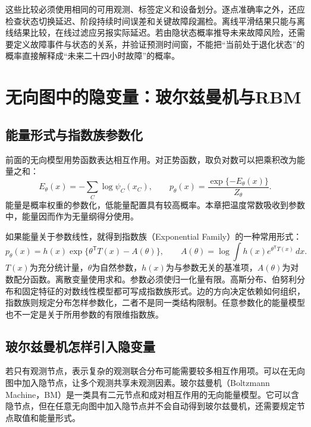 这些比较必须使用相同的可用观测、标签定义和设备划分。逐点准确率之外，还应检查状态切换延迟、阶段持续时间误差和关键故障段漏检。离线平滑结果只能与离线结果比较，在线过滤应另报实际延迟。若由隐状态概率推导未来故障风险，还需要定义故障事件与状态的关系，并验证预测时间窗，不能把“当前处于退化状态”的概率直接解释成“未来二十四小时故障”的概率。

\section{无向图中的隐变量：玻尔兹曼机与RBM}
\subsection{能量形式与指数族参数化}
前面的无向模型用势函数表达相互作用。对正势函数，取负对数可以把乘积改为能量之和：
\begin{equation}
 E_\theta(x)=-\sum_C\log\psi_C(x_C),\qquad
 p_\theta(x)=\frac{\exp\{-E_\theta(x)\}}{Z_\theta}.
 \label{eq:bayes-gibbs-energy}
\end{equation}
能量是概率权重的参数化，低能量配置具有较高概率。本章把温度常数吸收到参数中，能量因而作为无量纲得分使用。

如果能量关于参数线性，就得到指数族（Exponential Family）的一种常用形式：
\begin{equation}
 p_\theta(x)=h(x)\exp\{\theta^{\mathsf T}T(x)-A(\theta)\},
 \qquad A(\theta)=\log\int h(x)e^{\theta^{\mathsf T}T(x)}\,dx.
 \label{eq:bayes-exponential-family}
\end{equation}
$T(x)$为充分统计量，$\theta$为自然参数，$h(x)$为与参数无关的基准项，$A(\theta)$为对数配分函数。离散变量使用求和。参数必须使归一化量有限。高斯分布、伯努利分布和固定特征的对数线性模型都可写成指数族形式。边的方向决定依赖如何组织，指数族则规定分布怎样参数化，二者不是同一类结构限制。任意参数化的能量模型也不一定是关于所用参数的有限维指数族。

\subsection{玻尔兹曼机怎样引入隐变量}
若只有观测节点，表示复杂的观测联合分布可能需要较多相互作用项。可以在无向图中加入隐节点，让多个观测共享未观测因素。玻尔兹曼机（Boltzmann Machine，BM）是一类具有二元节点和成对相互作用的无向能量模型\cite{bishop2006pattern}。它可以含隐节点，但在任意无向图中加入隐节点并不会自动得到玻尔兹曼机，还需要规定节点取值和能量形式。

